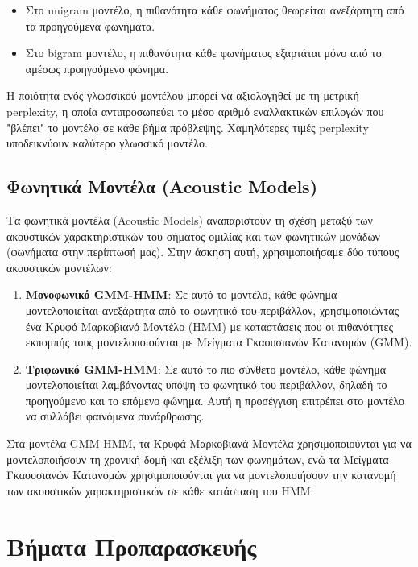 \documentclass[a4paper,12pt]{article}
\begin{document}
\begin{itemize}
    \item Στο unigram μοντέλο, η πιθανότητα κάθε φωνήματος θεωρείται ανεξάρτητη από τα προηγούμενα φωνήματα.
    \item Στο bigram μοντέλο, η πιθανότητα κάθε φωνήματος εξαρτάται μόνο από το αμέσως προηγούμενο φώνημα.
\end{itemize}

Η ποιότητα ενός γλωσσικού μοντέλου μπορεί να αξιολογηθεί με τη μετρική perplexity, η οποία αντιπροσωπεύει το μέσο αριθμό εναλλακτικών επιλογών που "βλέπει" το μοντέλο σε κάθε βήμα πρόβλεψης. Χαμηλότερες τιμές perplexity υποδεικνύουν καλύτερο γλωσσικό μοντέλο.

\subsection{Φωνητικά Μοντέλα (Acoustic Models)}

Τα φωνητικά μοντέλα (Acoustic Models) αναπαριστούν τη σχέση μεταξύ των ακουστικών χαρακτηριστικών του σήματος ομιλίας και των φωνητικών μονάδων (φωνήματα στην περίπτωσή μας). Στην άσκηση αυτή, χρησιμοποιήσαμε δύο τύπους ακουστικών μοντέλων:

\begin{enumerate}
    \item \textbf{Μονοφωνικό GMM-HMM}: Σε αυτό το μοντέλο, κάθε φώνημα μοντελοποιείται ανεξάρτητα από το φωνητικό του περιβάλλον, χρησιμοποιώντας ένα Κρυφό Μαρκοβιανό Μοντέλο (HMM) με καταστάσεις που οι πιθανότητες εκπομπής τους μοντελοποιούνται με Μείγματα Γκαουσιανών Κατανομών (GMM).
    
    \item \textbf{Τριφωνικό GMM-HMM}: Σε αυτό το πιο σύνθετο μοντέλο, κάθε φώνημα μοντελοποιείται λαμβάνοντας υπόψη το φωνητικό του περιβάλλον, δηλαδή το προηγούμενο και το επόμενο φώνημα. Αυτή η προσέγγιση επιτρέπει στο μοντέλο να συλλάβει φαινόμενα συνάρθρωσης.
\end{enumerate}

Στα μοντέλα GMM-HMM, τα Κρυφά Μαρκοβιανά Μοντέλα χρησιμοποιούνται για να μοντελοποιήσουν τη χρονική δομή και εξέλιξη των φωνημάτων, ενώ τα Μείγματα Γκαουσιανών Κατανομών χρησιμοποιούνται για να μοντελοποιήσουν την κατανομή των ακουστικών χαρακτηριστικών σε κάθε κατάσταση του HMM.

\section{Βήματα Προπαρασκευής}
\end{document}
